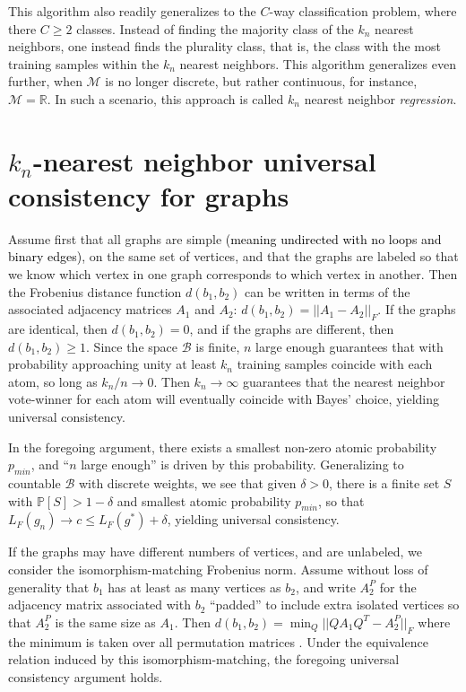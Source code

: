 \documentclass{article}
\newcommand{\mB}{\mathcal{B}}
\newcommand{\PP}{\mathbb{P}}           %
\newcommand{\Real}{\mathbb{R}}           %
\providecommand{\mc}[1]{\mathcal{#1}}
\providecommand{\tr}[1]{\textcolor{black}{#1}}
\begin{document}
This algorithm also readily generalizes to the $C$-way classification problem, where there $C \geq 2$ classes.  Instead of finding the majority class of the $k_n$ nearest neighbors, one instead finds the plurality class, that is, the class with the most training samples within the $k_n$ nearest neighbors.  This algorithm generalizes even further, when $\mc{M}$ is no longer discrete, but rather continuous, for instance, $\mc{M}=\Real$.  In such a scenario, this approach is called $k_n$ nearest neighbor \emph{regression}.




\section{$k_n$-nearest neighbor universal consistency for graphs}
\label{proof}

Assume first that all graphs are simple \tr{(meaning undirected with no loops and binary edges)}, on the same set of vertices, and that the graphs are labeled so that we know which vertex in one graph corresponds to which vertex in another. Then the Frobenius distance function $d(b_1,b_2)$ can be written in terms of the associated adjacency matrices $A_1$ and $A_2$: $d(b_1,b_2) = ||A_1-A_2||_F$. If the graphs are identical, then $d(b_1,b_2) = 0$, and if the graphs are different, then $d(b_1,b_2) \geq 1$. Since the space $\mB$ is finite, $n$ large enough guarantees that with probability approaching unity at least $k_n$ training samples coincide with each atom, so long as $k_n/n \rightarrow 0$. Then $k_n \rightarrow \infty$ guarantees that the nearest neighbor vote-winner for each atom will eventually coincide with Bayes' choice, yielding universal consistency.

In the foregoing argument, there exists a smallest non-zero atomic probability $p_{min}$, and ``$n$ large enough'' is driven by this probability. Generalizing to countable $\mB$ with discrete weights, we see that given $\delta > 0$, there is a finite set $S$ with $\PP[S]>1-\delta$ and smallest atomic probability $p_{min}$, so that $L_{F}(g_n) \rightarrow c \leq L_{F}(g^*) + \delta$, yielding universal consistency.

If the graphs may have different numbers of vertices, and are unlabeled, we consider the isomorphism-matching Frobenius norm. Assume without loss of generality that $b_1$ has at least as many vertices as $b_2$, and write $A_2^P$ for the adjacency matrix associated with $b_2$ ``padded'' to include extra isolated vertices so that $A_2^P$ is the same size as $A_1$. Then $d(b_1,b_2) = \min_Q ||Q A_1 Q^T - A_2^P||_F$ where the minimum is taken over all permutation matrices \cite{HornJohnson90}. Under the equivalence relation induced by this isomorphism-matching, the foregoing universal consistency argument holds.
\end{document}
